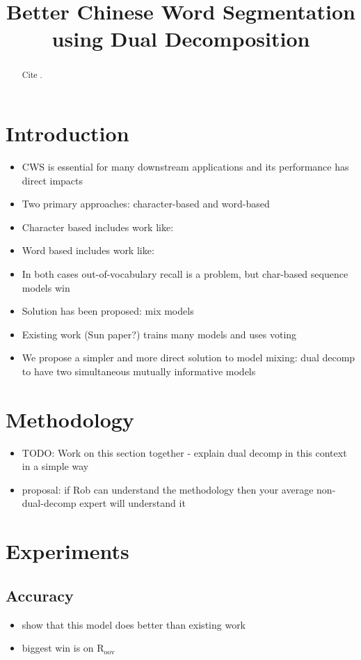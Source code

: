 \documentclass[11pt]{article}
\title{Better Chinese Word Segmentation using Dual Decomposition}
\date{}
\begin{document}
\maketitle
\begin{abstract}

Cite \cite{Sun:2013:IPM}.

\end{abstract}

\section{Introduction}

\begin{itemize}
\item CWS is essential for many downstream applications and its performance has direct impacts
\item Two primary approaches: character-based and word-based
\item Character based includes work like:
\item Word based includes work like:
\item In both cases out-of-vocabulary recall is a problem, but char-based sequence models win
\item Solution has been proposed: mix models
\item Existing work (Sun paper?) trains many models and uses voting
\item We propose a simpler and more direct solution to model mixing: dual decomp to have two simultaneous mutually informative models
\end{itemize}

\section{Methodology}

\begin{itemize}
\item TODO: Work on this section together - explain dual decomp in this context in a simple way
\item proposal: if Rob can understand the methodology then your average non-dual-decomp expert will understand it
\end{itemize}

\section{Experiments}

\subsection{Accuracy}
\begin{itemize}
\item show that this model does better than existing work
\item biggest win is on R$_{\mathrm{oov}}$
\end{itemize}
\end{document}
